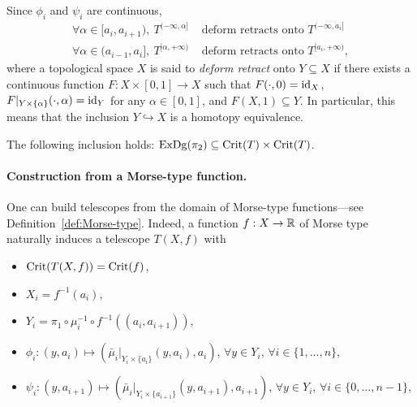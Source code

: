 \begin{lem}\label{lem:defret} 
Since $\phi_i$ and $\psi_i$ are continuous,
\begin{align*}
\forall \alpha\in [a_i,a_{i+1}),\ T^{(-\infty,\alpha]}&\text{ deform retracts onto }T^{(-\infty,a_i]} \\
\forall \alpha\in (a_{i-1},a_i],\ T^{[\alpha,+\infty)}&\text{ deform retracts onto }T^{[a_i,+\infty)},
\end{align*}
where a topological space $X$ is said to {\em deform retract} onto $Y\subseteq X$ if there exists a continuous function $F:X\times[0,1]\rightarrow X$
such that $F(\cdot,0)={\rm id}_X$, $F|_{Y\times\{\alpha\}}(\cdot,\alpha)={\rm id}_Y$ for any $\alpha\in[0,1]$, and $F(X,1)\subseteq Y$. In particular, 
this means that the inclusion $Y\hookrightarrow X$ is a homotopy equivalence. 
\end{lem}


\begin{cor} The following inclusion holds:
$\mathrm{ExDg}(\pi_2)\subseteq\mathrm{Crit}(T)\times\mathrm{Crit}(T)$.
\end{cor}


\paragraph*{Construction from a Morse-type function.}
One can build telescopes from the domain of Morse-type functions---see Definition~\ref{def:Morse-type}.
%
Indeed, a function $f:X\rightarrow\mathbb{R}$ of Morse type 
naturally induces a telescope $T(X,f)$ with
\begin{itemize} 
\item $\mathrm{Crit}(T(X,f))=\mathrm{Crit}(f)$, 
\item $X_i=f^{-1}(a_i)$, 
\item $Y_i=\pi_1\circ\mu_i^{-1}\circ f^{-1}((a_i,a_{i+1}))$,
\item $\phi_i:(y,a_i)\mapsto(\bar{\mu}_i|_{Y_i\times\{a_i\}}(y,a_i),a_i)$, $\forall y\in Y_i$, $\forall i\in\{1,...,n\}$,
\item $\psi_i:(y,a_{i+1})\mapsto(\bar{\mu}_i|_{Y_i\times\{a_{i+1}\}}(y,a_{i+1}),a_{i+1})$, $\forall y\in Y_i$, $\forall i\in\{0,...,n-1\}$,
\end{itemize}

